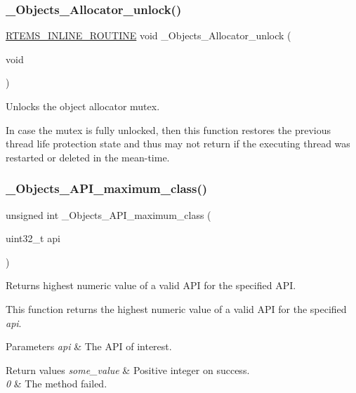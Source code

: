 \subsubsection{\texorpdfstring{\_Objects\_Allocator\_unlock()}{\_Objects\_Allocator\_unlock()}}
{\footnotesize\ttfamily \mbox{\hyperlink{group__RTEMSScoreBaseDefs_gac216239df231d5dbd15e3520b0b9313f}{R\+T\+E\+M\+S\+\_\+\+I\+N\+L\+I\+N\+E\+\_\+\+R\+O\+U\+T\+I\+NE}} void \+\_\+\+Objects\+\_\+\+Allocator\+\_\+unlock (\begin{DoxyParamCaption}\item[{void}]{ }\end{DoxyParamCaption})}



Unlocks the object allocator mutex. 

In case the mutex is fully unlocked, then this function restores the previous thread life protection state and thus may not return if the executing thread was restarted or deleted in the mean-\/time. \mbox{\label{group__RTEMSScoreObject_ga160a712acafe6e9c4a8b9ea6dcc2597b}} 
\subsubsection{\texorpdfstring{\_Objects\_API\_maximum\_class()}{\_Objects\_API\_maximum\_class()}}
{\footnotesize\ttfamily unsigned int \+\_\+\+Objects\+\_\+\+A\+P\+I\+\_\+maximum\+\_\+class (\begin{DoxyParamCaption}\item[{uint32\+\_\+t}]{api }\end{DoxyParamCaption})}



Returns highest numeric value of a valid A\+PI for the specified A\+PI. 

This function returns the highest numeric value of a valid A\+PI for the specified {\itshape api}.


\begin{DoxyParams}{Parameters}
{\em api} & The A\+PI of interest.\\
\hline
\end{DoxyParams}

\begin{DoxyRetVals}{Return values}
{\em some\+\_\+value} & Positive integer on success. \\
\hline
{\em 0} & The method failed. \\
\hline
\end{DoxyRetVals}
\mbox{\label{group__RTEMSScoreObject_gaba59419fd15c39c93eedbaba5788de05}} 
